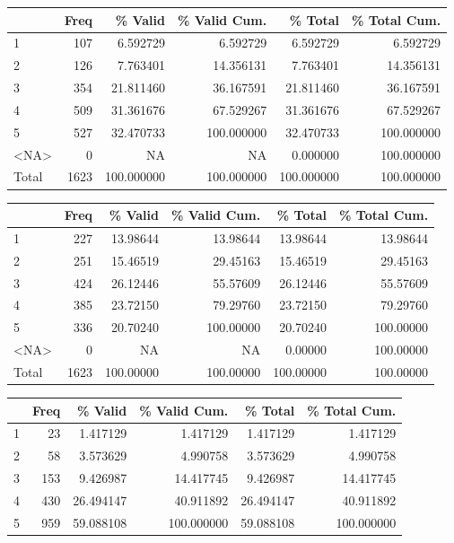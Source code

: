 \documentclass[
  letterpaper,
  DIV=11,
  numbers=noendperiod]{scrartcl}
\begin{document}
\begin{table}
\centering
\begin{tabular}[t]{l|r|r|r|r|r}
\hline
  & Freq & \% Valid & \% Valid Cum. & \% Total & \% Total Cum.\\
\hline
1 & 107 & 6.592729 & 6.592729 & 6.592729 & 6.592729\\
\hline
2 & 126 & 7.763401 & 14.356131 & 7.763401 & 14.356131\\
\hline
3 & 354 & 21.811460 & 36.167591 & 21.811460 & 36.167591\\
\hline
4 & 509 & 31.361676 & 67.529267 & 31.361676 & 67.529267\\
\hline
5 & 527 & 32.470733 & 100.000000 & 32.470733 & 100.000000\\
\hline
<NA> & 0 & NA & NA & 0.000000 & 100.000000\\
\hline
Total & 1623 & 100.000000 & 100.000000 & 100.000000 & 100.000000\\
\hline
\end{tabular}
\centering
\begin{tabular}[t]{l|r|r|r|r|r}
\hline
  & Freq & \% Valid & \% Valid Cum. & \% Total & \% Total Cum.\\
\hline
1 & 227 & 13.98644 & 13.98644 & 13.98644 & 13.98644\\
\hline
2 & 251 & 15.46519 & 29.45163 & 15.46519 & 29.45163\\
\hline
3 & 424 & 26.12446 & 55.57609 & 26.12446 & 55.57609\\
\hline
4 & 385 & 23.72150 & 79.29760 & 23.72150 & 79.29760\\
\hline
5 & 336 & 20.70240 & 100.00000 & 20.70240 & 100.00000\\
\hline
<NA> & 0 & NA & NA & 0.00000 & 100.00000\\
\hline
Total & 1623 & 100.00000 & 100.00000 & 100.00000 & 100.00000\\
\hline
\end{tabular}
\centering
\begin{tabular}[t]{l|r|r|r|r|r}
\hline
  & Freq & \% Valid & \% Valid Cum. & \% Total & \% Total Cum.\\
\hline
1 & 23 & 1.417129 & 1.417129 & 1.417129 & 1.417129\\
\hline
2 & 58 & 3.573629 & 4.990758 & 3.573629 & 4.990758\\
\hline
3 & 153 & 9.426987 & 14.417745 & 9.426987 & 14.417745\\
\hline
4 & 430 & 26.494147 & 40.911892 & 26.494147 & 40.911892\\
\hline
5 & 959 & 59.088108 & 100.000000 & 59.088108 & 100.000000\\

\end{tabular}
\end{table}
\end{document}
